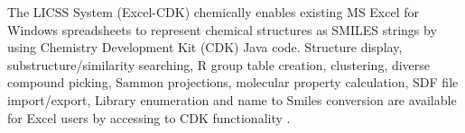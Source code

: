 The LICSS System (Excel-CDK) chemically enables existing MS Excel for Windows spreadsheets to represent chemical structures as SMILES strings by using Chemistry Development Kit (CDK) Java code. Structure display, substructure/similarity searching, R group table creation, clustering, diverse compound picking, Sammon projections, molecular property calculation, SDF file import/export, Library enumeration and name to Smiles conversion are available for Excel users by accessing to CDK functionality . 